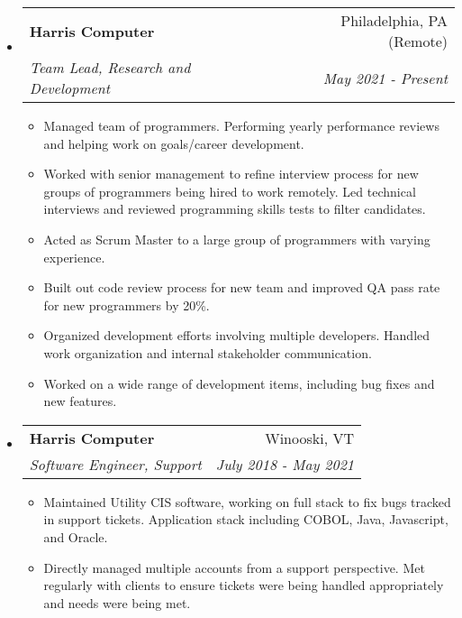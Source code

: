 \documentclass[letterpaper,12pt]{article}
\makeatletter
\newcommand{\resitem}[1]{\item #1 \vspace{-2pt}}
\newcommand{\ressubheading}[4]{
\begin{tabular*}{6.5in}{l@{\extracolsep{\fill}}r}
		\textbf{#1} & #2 \\
		\textit{#3} & \textit{#4} \\
\end{tabular*}\vspace{-6pt}}
\makeatother
\begin{document}
\begin{itemize}


\vspace{-1mm}

\item
	\ressubheading{Harris Computer}{Philadelphia, PA (Remote)}{Team Lead, Research and Development}{May 2021 - Present}
	\begin{itemize}
		
		\resitem{Managed team of programmers. Performing yearly performance reviews and helping work on goals/career development.}
		
		\resitem{Worked with senior management to refine interview process for new groups of programmers being hired to work remotely. Led technical interviews and reviewed programming skills tests to filter candidates.}
		
		\resitem{Acted as Scrum Master to a large group of programmers with varying experience.}
		
		\resitem{Built out code review process for new team and improved QA pass rate for new programmers by 20\%.}
		
		\resitem{Organized development efforts involving multiple developers. Handled work organization and internal stakeholder communication.}
		
		\resitem{Worked on a wide range of development items, including bug fixes and new features.}
	
		
		
		
	\end{itemize}

\item		
	\ressubheading{Harris Computer}{Winooski, VT}{Software Engineer, Support}{July 2018 - May 2021}
	\begin{itemize}
		
		\resitem{Maintained Utility CIS software, working on full stack to fix bugs tracked in support tickets. Application stack including COBOL, Java, Javascript, and Oracle.}
		
		\resitem{Directly managed multiple accounts from a support perspective. Met regularly with clients to ensure tickets were being handled appropriately and needs were being met.}
		

\end{itemize}
\end{itemize}
\end{document}
